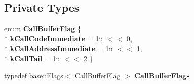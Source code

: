 \subsection*{Private Types}
\begin{DoxyCompactItemize}
\item 
enum {\bfseries Call\+Buffer\+Flag} \{ \\*
{\bfseries k\+Call\+Code\+Immediate} = 1u $<$$<$ 0, 
\\*
{\bfseries k\+Call\+Address\+Immediate} = 1u $<$$<$ 1, 
\\*
{\bfseries k\+Call\+Tail} = 1u $<$$<$ 2
 \}\hypertarget{classv8_1_1internal_1_1compiler_1_1_instruction_selector_afde2c75b026818629c0b2c7e8e39ec9b}{}\label{classv8_1_1internal_1_1compiler_1_1_instruction_selector_afde2c75b026818629c0b2c7e8e39ec9b}

\item 
typedef \hyperlink{classv8_1_1base_1_1_flags}{base\+::\+Flags}$<$ Call\+Buffer\+Flag $>$ {\bfseries Call\+Buffer\+Flags}\hypertarget{classv8_1_1internal_1_1compiler_1_1_instruction_selector_a3981192522bcae8835615175fa5a984c}{}\label{classv8_1_1internal_1_1compiler_1_1_instruction_selector_a3981192522bcae8835615175fa5a984c}

\end{DoxyCompactItemize}
